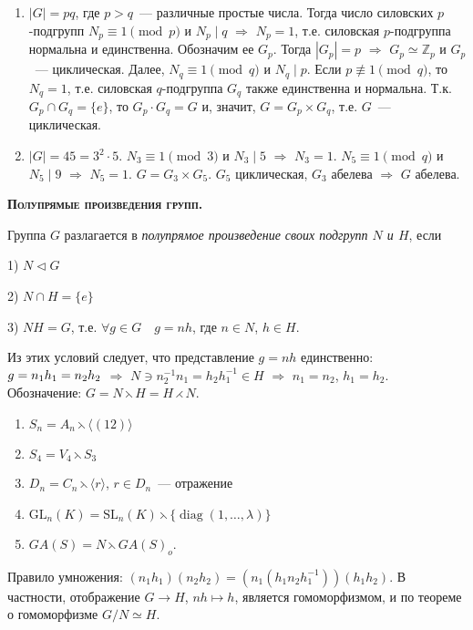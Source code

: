 \documentclass[a4paper]{article}
\newcommand*{\tema}[1]{\vspace{20pt}
\begin{center}{\textbf{\textsc{#1.}}}\vspace{5pt}
\end{center}}
\newcommand{\diag}{\mathop{\mathrm{diag}}\nolimits}
\newcommand*{\p}[1]{#1\nobreak\discretionary{}{\hbox{$\mathsurround=0pt #1$}}{}}
\begin{document}
\prim
\begin{enumerate}
  \item $|G|=pq$, где $p>q$~--- различные простые числа. Тогда число
  силовских $p$-подгрупп $N_p\equiv1\pmod{p}$ и $N_p\mid q$
  $\Rightarrow$ $N_p=1$, т.е. силовская $p$-подгруппа нормальна и
  единственна. Обозначим ее $G_p$. Тогда $|G_p|=p$ $\Rightarrow$ $G_p\simeq
  \mathbb{Z}_p$ и $G_p$~--- циклическая. Далее, $N_q\equiv1\pmod{q}$
  и $N_q\mid p$. Если $p\not\equiv1\pmod{q}$, то $N_q=1$, т.е.
  силовская $q$-подгруппа $G_q$ также единственна и нормальна. Т.к.
  $G_p\cap G_q=\{e\}$, то $G_p\cdot G_q=G$ и, значит, $G=G_p\times
  G_q$, т.е. $G$~--- циклическая.
  \item $|G|=45=3^2\cdot5$. $N_3\equiv1\pmod{3}$ и $N_3\mid 5$
  $\Rightarrow$ $N_3=1$. $N_5\equiv1\pmod{q}$ и $N_5\mid 9$
  $\Rightarrow$ $N_5=1$. $G=G_3\times G_5$. $G_5$ циклическая, $G_3$
  абелева $\Rightarrow$ $G$ абелева.
\end{enumerate}

\tema{Полупрямые произведения групп}

Группа $G$ разлагается в \emph{полупрямое произведение своих
подгрупп $N$ и $H$}, если

1) $N\triangleleft G$

2) $N\cap H=\{e\}$

3) $NH=G$, т.е. $\forall g\in G\quad g=nh$, где $n\in N$, $h\in H$.

Из этих условий следует, что представление $g=nh$ единственно:
$g\p=n_1h_1=n_2h_2$ $\Rightarrow$ $N\ni n_2^{-1}n_1=h_2h_1^{-1}\in
H$ $\Rightarrow$ $n_1=n_2$, $h_1=h_2$. Обозначение:
$G=N\leftthreetimes H=H\rightthreetimes N$.

\prim
\begin{enumerate}
  \item $S_n=A_n\leftthreetimes \langle(12)\rangle$
  \item $S_4=V_4\leftthreetimes S_3$
  \item $D_n=C_n\leftthreetimes \langle r\rangle$, $r\in D_n$~---
  отражение
  \item $\mathrm{GL}_n(K)=\mathrm{SL}_n(K)\leftthreetimes \{\diag(1,\ldots,\lambda)\}$
  \item $GA(S)=N\leftthreetimes GA(S)_o$.
\end{enumerate}

Правило умножения: $(n_1h_1)(n_2h_2)=(n_1(h_1n_2h_1^{-1}))(h_1h_2)$.
В частности, отображение $G\to H$, $nh\mapsto h$, является
гомоморфизмом, и по теореме о гомоморфизме $G/N\simeq H$.
\end{document}
